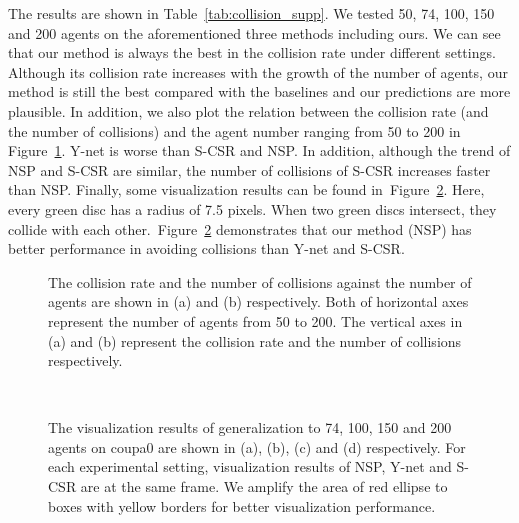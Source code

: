 \documentclass[runningheads]{llncs}
\newcommand{\Figref}[1]{Figure~\ref{fig:#1}}
\newcommand{\Tabref}[1]{Table~\ref{tab:#1}}
\begin{document}
The results are shown in \Tabref{collision_supp}. We tested 50, 74, 100, 150 and 200 agents on the aforementioned three methods including ours. We can see that our method is always the best in the collision rate under different settings. Although its collision rate increases with the growth of the number of agents, our method is still the best compared with the baselines and our predictions are more plausible. In addition, we also plot the relation between the collision rate (and the number of collisions) and the agent number ranging from 50 to 200 in \Figref{col_all_supp}. Y-net is worse than S-CSR and NSP. In addition, although the trend of NSP and S-CSR are similar, the number of collisions of S-CSR increases faster than NSP. Finally, some visualization results can be found in~\Figref{col_vis_supp}. Here, every green disc has a radius of 7.5 pixels. When two green discs intersect, they collide with each other.~\Figref{col_vis_supp} demonstrates that our method (NSP) has better performance in avoiding collisions than Y-net and S-CSR.         


\begin{figure}[tb]
\centering
{} 
\caption{The collision rate and the number of collisions against the number of agents are shown in (a) and (b) respectively. Both of horizontal axes represent the number of agents from 50 to 200. The vertical axes in (a) and (b) represent the collision rate and the number of collisions respectively.  }
\label{fig:col_all_supp}
\end{figure}


\begin{figure}[tb]
\centering
{} 
\\ \centering
{} 
\caption{The visualization results of generalization to 74, 100, 150 and 200 agents on coupa0 are shown in (a), (b), (c) and (d) respectively. For each experimental setting, visualization results of NSP, Y-net and S-CSR are at the same frame. We amplify the area of red ellipse to boxes with yellow borders for better visualization performance.}
\label{fig:col_vis_supp}
\end{figure}
\end{document}
